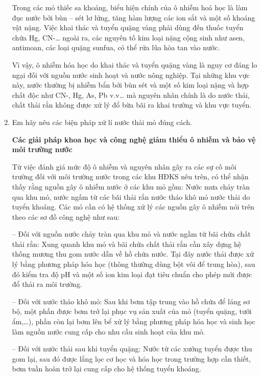\begin{enumerate}[label=\bfseries Câu \arabic*:]
{		Trong các mỏ thiếc sa khoáng, biểu hiện chính của ô nhiễm hoá học là làm đục nước bởi bùn – sét lơ lửng, tăng hàm lượng các ion sắt và một số khoáng vật nặng. Việc khai thác và tuyển quặng vàng phải dùng đến thuốc tuyển chứa Hg, CN-… ngoài ra, các nguyên tố kim loại nặng cộng sinh như asen, antimoan, các loại quặng sunfua, có thể rửa lũa hòa tan vào nước.
		
		Vì vậy, ô nhiễm hóa học do khai thác và tuyển quặng vàng là nguy cơ đáng lo ngại đối với nguồn nước sinh hoạt và nước nông nghiệp. Tại những khu vực này, nước thường bị nhiễm bẩn bởi bùn sét và một số kim loại nặng và hợp chất độc như CN-, Hg, As, Pb v.v… mà nguyên nhân chính là do nước thải, chất thải rắn không được xử lý đổ bừa bãi ra khai trường và khu vực tuyển.
		
	}
	\item {}
	
	
	{
		Em hãy nêu các biện pháp xử lí nước thải mỏ đúng cách.
	}
	
	\hideall
	{
		
		\textbf{Các giải pháp khoa học và công nghệ giảm thiểu ô nhiễm và bảo vệ môi trường nước}
		
		Từ việc đánh giá mức độ ô nhiễm và nguyên nhân gây ra các sự cố môi trường đối với môi trường nước trong các khu HĐKS nêu trên, có thể nhận thấy rằng nguồn gây ô nhiễm nước ở các khu mỏ gồm: Nước mưa chảy tràn qua khu mỏ, nước ngấm từ các bãi thải rắn nước tháo khô mỏ nước thải do tuyển khoáng. Các mỏ cần có hệ thống xử lý các nguồn gây ô nhiễm nói trên theo các sơ đồ công nghệ như sau:
		
		– Đối với nguồn nước chảy tràn qua khu mỏ và nước ngầm từ bãi chứa chất thải rắn: Xung quanh khu mỏ và bãi chứa chất thải rắn cần xây dựng hệ thống mương thu gom nước dẫn về hồ chứa nước. Tại đây nước thải được xử lý bằng phương pháp hóa học (thông thường dùng bột vôi để trung hòa), sau đó kiểm tra độ pH và một số ion kim loại đạt tiêu chuẩn cho phép mới được đổ thải ra môi trường.
		
		– Đối với nước tháo khô mỏ: Sau khi bơm tập trung vào hồ chứa để láng sơ bộ, một phần được bơm trở lại phục vụ sản xuất của mỏ (tuyển quặng, tưới ẩm,…), phần còn lại bơm lên bể xử lý bằng phương pháp hóa học và sinh học làm nguồn nước cung cấp cho nhu cầu sinh hoạt của khu mỏ.
		
		– Đối với nước thải sau khi tuyển quặng: Nước từ các xưởng tuyển được thu gom lại, sau đó được lắng lọc cơ học và hóa học trong trường hợp cần thiết, bơm tuần hoàn trở lại cung cấp cho hệ thống tuyển khoáng.
		
}
\end{enumerate}
